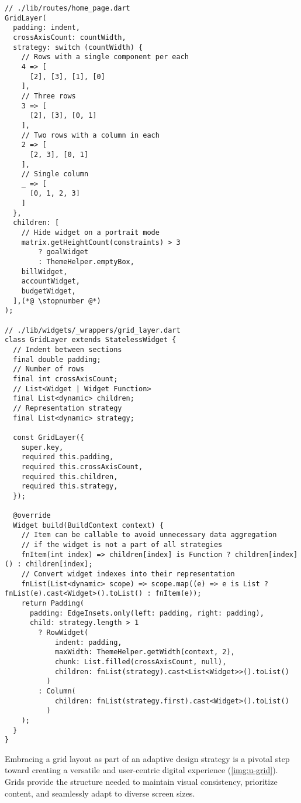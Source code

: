 \begin{lstlisting}
// ./lib/routes/home_page.dart
GridLayer(
  padding: indent,
  crossAxisCount: countWidth,
  strategy: switch (countWidth) {
    // Rows with a single component per each
    4 => [
      [2], [3], [1], [0]
    ],
    // Three rows
    3 => [
      [2], [3], [0, 1]
    ],
    // Two rows with a column in each
    2 => [
      [2, 3], [0, 1]
    ],
    // Single column
    _ => [
      [0, 1, 2, 3]
    ]
  },
  children: [
    // Hide widget on a portrait mode
    matrix.getHeightCount(constraints) > 3
        ? goalWidget
        : ThemeHelper.emptyBox,
    billWidget,
    accountWidget,
    budgetWidget,
  ],(*@ \stopnumber @*)
);

// ./lib/widgets/_wrappers/grid_layer.dart
class GridLayer extends StatelessWidget {
  // Indent between sections
  final double padding;
  // Number of rows
  final int crossAxisCount;
  // List<Widget | Widget Function>
  final List<dynamic> children;
  // Representation strategy
  final List<dynamic> strategy;

  const GridLayer({
    super.key,
    required this.padding,
    required this.crossAxisCount,
    required this.children,
    required this.strategy,
  });

  @override
  Widget build(BuildContext context) {
    // Item can be callable to avoid unnecessary data aggregation
    // if the widget is not a part of all strategies
    fnItem(int index) => children[index] is Function ? children[index]() : children[index];
    // Convert widget indexes into their representation
    fnList(List<dynamic> scope) => scope.map((e) => e is List ? fnList(e).cast<Widget>().toList() : fnItem(e));
    return Padding(
      padding: EdgeInsets.only(left: padding, right: padding),
      child: strategy.length > 1
        ? RowWidget(
            indent: padding,
            maxWidth: ThemeHelper.getWidth(context, 2),
            chunk: List.filled(crossAxisCount, null),
            children: fnList(strategy).cast<List<Widget>>().toList()
          )
        : Column(
            children: fnList(strategy.first).cast<Widget>().toList()
          )
    );
  }
}
\end{lstlisting}

Embracing a grid layout as part of an adaptive design strategy is a pivotal step toward creating a versatile and 
user-centric digital experience (\cref{img:u-grid}). Grids provide the structure needed to maintain visual consistency, 
prioritize content, and seamlessly adapt to diverse screen sizes.

